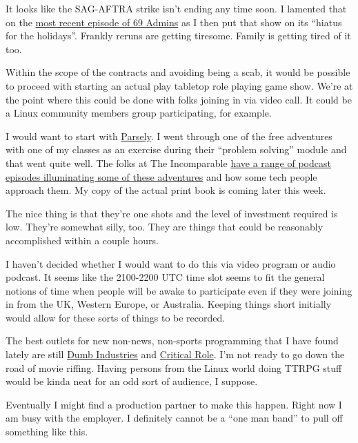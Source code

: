 It looks like the SAG-AFTRA strike isn't ending any time soon. I
lamented that on the
\href{https://69admins.com/2023/episode-14.html}{most recent episode of
69 Admins} as I then put that show on its ``hiatus for the holidays''.
Frankly reruns are getting tiresome. Family is getting tired of it too.

Within the scope of the contracts and avoiding being a scab, it would be
possible to proceed with starting an actual play tabletop role playing
game show. We're at the point where this could be done with folks
joining in via video call. It could be a Linux community members group
participating, for example.

I would want to start with
\href{http://www.memento-mori.com/pdf/parsely-pdf}{Parsely}. I went
through one of the free adventures with one of my classes as an exercise
during their ``problem solving'' module and that went quite well. The
folks at The Incomparable
\href{https://www.theincomparable.com/gameshow/actioncastle/}{have a
range of podcast episodes illuminating some of these adventures} and how
some tech people approach them. My copy of the actual print book is
coming later this week.

The nice thing is that they're one shots and the level of investment
required is low. They're somewhat silly, too. They are things that could
be reasonably accomplished within a couple hours.

I haven't decided whether I would want to do this via video program or
audio podcast. It seems like the 2100-2200 UTC time slot seems to fit
the general notions of time when people will be awake to participate
even if they were joining in from the UK, Western Europe, or Australia.
Keeping things short initially would allow for these sorts of things to
be recorded.

The best outlets for new non-news, non-sports programming that I have
found lately are still \href{https://dumb-industries.com/}{Dumb
Industries} and \href{https://critrole.com/}{Critical Role}. I'm not
ready to go down the road of movie riffing. Having persons from the
Linux world doing TTRPG stuff would be kinda neat for an odd sort of
audience, I suppose.

Eventually I might find a production partner to make this happen. Right
now I am busy with the employer. I definitely cannot be a ``one man
band'' to pull off something like this.
